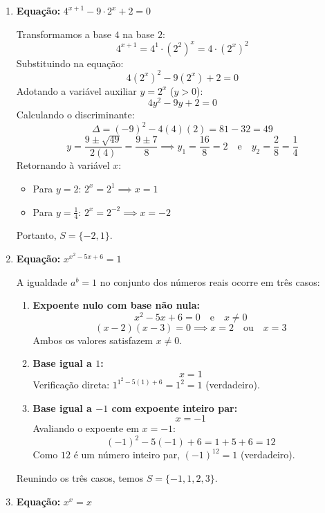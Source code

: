 \documentclass[12pt,a4paper]{report}
\begin{document}
\begin{enumerate}[label=\textbf{\arabic*.}]
	\vspace{0.5cm}
	
	\item \textbf{Equação:} $4^{x+1} - 9 \cdot 2^x + 2 = 0$
	
	Transformamos a base $4$ na base $2$:
	\[
	4^{x+1} = 4^1 \cdot (2^2)^x = 4 \cdot (2^x)^2
	\]
	Substituindo na equação:
	\[
	4(2^x)^2 - 9(2^x) + 2 = 0
	\]
	Adotando a variável auxiliar $y = 2^x$ ($y > 0$):
	\[
	4y^2 - 9y + 2 = 0
	\]
	Calculando o discriminante:
	\[
	\Delta = (-9)^2 - 4(4)(2) = 81 - 32 = 49
	\]
	\[
	y = \frac{9 \pm \sqrt{49}}{2(4)} = \frac{9 \pm 7}{8} \implies y_1 = \frac{16}{8} = 2 \quad \text{e} \quad y_2 = \frac{2}{8} = \frac{1}{4}
	\]
	Retornando à variável $x$:
	\begin{itemize}
		\item Para $y = 2$: $2^x = 2^1 \implies x = 1$
		\item Para $y = \frac{1}{4}$: $2^x = 2^{-2} \implies x = -2$
	\end{itemize}
	Portanto, $S = \{-2, 1\}$.
	
	\vspace{0.5cm}
	
	\item \textbf{Equação:} $x^{x^2-5x+6} = 1$
	
	A igualdade $a^b = 1$ no conjunto dos números reais ocorre em três casos:
	\begin{enumerate}[label=\alph*)]
		\item \textbf{Expoente nulo com base não nula:}
		\[
		x^2 - 5x + 6 = 0 \quad \text{e} \quad x \neq 0
		\]
		\[
		(x - 2)(x - 3) = 0 \implies x = 2 \quad \text{ou} \quad x = 3
		\]
		Ambos os valores satisfazem $x \neq 0$.
		
		\item \textbf{Base igual a $1$:}
		\[
		x = 1
		\]
		Verificação direta: $1^{1^2 - 5(1) + 6} = 1^2 = 1$ (verdadeiro).
		
		\item \textbf{Base igual a $-1$ com expoente inteiro par:}
		\[
		x = -1
		\]
		Avaliando o expoente em $x = -1$:
		\[
		(-1)^2 - 5(-1) + 6 = 1 + 5 + 6 = 12
		\]
		Como $12$ é um número inteiro par, $(-1)^{12} = 1$ (verdadeiro).
	\end{enumerate}
	Reunindo os três casos, temos $S = \{-1, 1, 2, 3\}$.
	
	\vspace{0.5cm}
	
	\item \textbf{Equação:} $x^x = x$
	

\end{enumerate}
\end{document}
